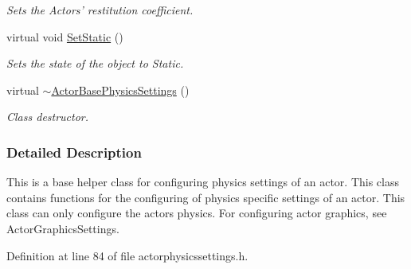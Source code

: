 \begin{DoxyCompactItemize}
\begin{DoxyCompactList}\small\item\em Sets the Actors' restitution coefficient. \item\end{DoxyCompactList}\item 
virtual void \hyperlink{classMezzanine_1_1ActorBasePhysicsSettings_ac72f39fa6bc9e2f050fdf90e42dd0deb}{SetStatic} ()
\begin{DoxyCompactList}\small\item\em Sets the state of the object to Static. \item\end{DoxyCompactList}\item 
\hypertarget{classMezzanine_1_1ActorBasePhysicsSettings_a6273131ed9e51182abde28d5af4ded83}{
virtual \hyperlink{classMezzanine_1_1ActorBasePhysicsSettings_a6273131ed9e51182abde28d5af4ded83}{$\sim$ActorBasePhysicsSettings} ()}
\label{classMezzanine_1_1ActorBasePhysicsSettings_a6273131ed9e51182abde28d5af4ded83}

\begin{DoxyCompactList}\small\item\em Class destructor. \item\end{DoxyCompactList}\end{DoxyCompactItemize}


\subsubsection{Detailed Description}
This is a base helper class for configuring physics settings of an actor. This class contains functions for the configuring of physics specific settings of an actor. This class can only configure the actors physics. For configuring actor graphics, see ActorGraphicsSettings. 

Definition at line 84 of file actorphysicssettings.h.



